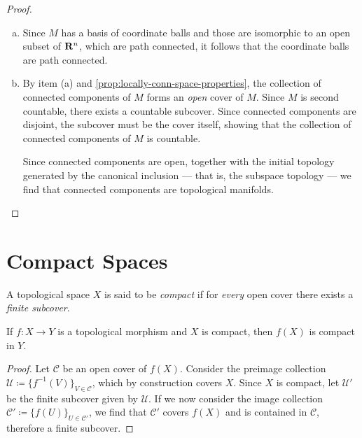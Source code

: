 \begin{proof}
\begin{enumerate}[(a)]\setlength\itemsep{0em}
\item Since \(M\) has a basis of coordinate balls and those are isomorphic to an
  open subset of \(\mathbf{R}^n\), which are path connected, it follows that the
  coordinate balls are path connected.

\item By item (a) and \cref{prop:locally-conn-space-properties}, the collection
  of connected components of \(M\) forms an \emph{open} cover of \(M\). Since
  \(M\) is second countable, there exists a countable subcover. Since connected
  components are disjoint, the subcover must be the cover itself, showing that
  the collection of connected components of \(M\) is countable.

  Since connected components are open, together with the initial topology
  generated by the canonical inclusion --- that is, the subspace topology --- we
  find that connected components are topological manifolds.
\end{enumerate}
\end{proof}

\section{Compact Spaces}

\begin{definition}
\label{def:compact-space}
A topological space \(X\) is said to be \emph{compact} if for \emph{every} open
cover there exists a \emph{finite subcover}.
\end{definition}

\begin{proposition}
\label{prop:image-of-compact-is-compact}
If \(f: X \to Y\) is a topological morphism and \(X\) is compact, then \(f(X)\)
is compact in \(Y\).
\end{proposition}

\begin{proof}
Let \(\mathcal{C}\) be an open cover of \(f(X)\). Consider the preimage
collection \(\mathcal{U} \coloneq \{f^{-1}(V)\}_{V \in \mathcal{C}}\), which by
construction covers \(X\). Since \(X\) is compact, let \(\mathcal{U}'\) be the
finite subcover given by \(\mathcal{U}\). If we now consider the image
collection \(\mathcal{C}' \coloneq \{f(U)\}_{U \in \mathcal{C}'}\), we find that
\(\mathcal{C}'\) covers \(f(X)\) and is contained in \(\mathcal{C}\), therefore
a finite subcover.
\end{proof}


